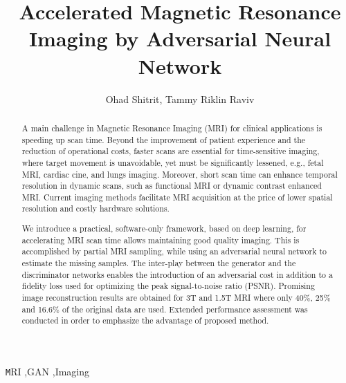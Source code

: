 \documentclass[review]{elsarticle}
\begin{document}
\begin{frontmatter}

\title{Accelerated Magnetic Resonance Imaging by Adversarial Neural Network}

\author{Ohad Shitrit, Tammy Riklin Raviv}
\address{$^1$Department of Electrical Engineering, 
	     $^2$The Zlotowski Center for Neuroscience
	     Ben-Gurion University of the Negev, Israel}

\begin{abstract}
A main challenge in Magnetic Resonance Imaging (MRI) for clinical applications is speeding up scan time. Beyond the improvement of patient experience and the reduction of operational costs, faster scans are essential for time-sensitive imaging, where target movement is unavoidable, yet must be significantly lessened, e.g., fetal MRI, cardiac cine, and lungs imaging. Moreover, short scan time can enhance temporal resolution in dynamic scans, such as functional MRI or dynamic contrast enhanced MRI. Current imaging methods facilitate MRI acquisition at the price of lower spatial resolution and costly hardware solutions.

We introduce a practical, software-only framework, based on deep learning, for accelerating MRI scan time allows maintaining good quality imaging. This is accomplished by partial MRI sampling, while using an adversarial neural network to estimate the missing samples. The inter-play between the generator and the discriminator networks enables the introduction of an adversarial cost in addition to a fidelity loss used for optimizing the peak signal-to-noise ratio (PSNR). Promising image reconstruction results are obtained for 3T and 1.5T MRI where only 40\%, 25\% and 16.6\% of the original data are used. Extended performance assessment was conducted in order to emphasize the advantage of proposed method.
\end{abstract}

\begin{keyword}
\texttt MRI \sep GAN \sep Imaging
\end{keyword}

\end{frontmatter}

\linenumbers
\end{document}
